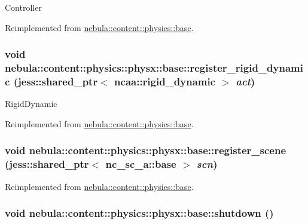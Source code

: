 Controller 

Reimplemented from \hyperlink{classnebula_1_1content_1_1physics_1_1base_aa4fbec83999fc625de031aeb344f72e7}{nebula::content::physics::base}.\hypertarget{classnebula_1_1content_1_1physics_1_1physx_1_1base_a23f4f739171151f95ab7e08e1bcb5504}{
\subsubsection[{register\_\-rigid\_\-dynamic}]{\setlength{\rightskip}{0pt plus 5cm}void nebula::content::physics::physx::base::register\_\-rigid\_\-dynamic (jess::shared\_\-ptr$<$ {\bf ncaa::rigid\_\-dynamic} $>$ {\em act})}}
\label{classnebula_1_1content_1_1physics_1_1physx_1_1base_a23f4f739171151f95ab7e08e1bcb5504}


RigidDynamic 

Reimplemented from \hyperlink{classnebula_1_1content_1_1physics_1_1base_a5ab352e13a71a10f06384813b5d25606}{nebula::content::physics::base}.\hypertarget{classnebula_1_1content_1_1physics_1_1physx_1_1base_a3c01f6c425f68341bed6a71f2ff52919}{
\subsubsection[{register\_\-scene}]{\setlength{\rightskip}{0pt plus 5cm}void nebula::content::physics::physx::base::register\_\-scene (jess::shared\_\-ptr$<$ {\bf nc\_\-sc\_\-a::base} $>$ {\em scn})}}
\label{classnebula_1_1content_1_1physics_1_1physx_1_1base_a3c01f6c425f68341bed6a71f2ff52919}


Reimplemented from \hyperlink{classnebula_1_1content_1_1physics_1_1base_ac8e51a62a836f57b1e65f80cc92d0f0a}{nebula::content::physics::base}.\hypertarget{classnebula_1_1content_1_1physics_1_1physx_1_1base_a4419704349a8cc19aa1c633d8694d598}{
\subsubsection[{shutdown}]{\setlength{\rightskip}{0pt plus 5cm}void nebula::content::physics::physx::base::shutdown ()}}
\label{classnebula_1_1content_1_1physics_1_1physx_1_1base_a4419704349a8cc19aa1c633d8694d598}


